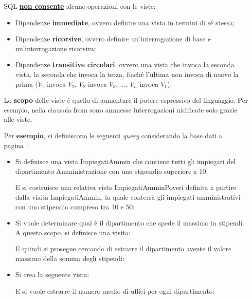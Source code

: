 \documentclass[a4paper]{article}
\begin{document}
	\noindent
	SQL \textbf{\underline{non consente}} alcune operazioni con le viste:
	\begin{itemize}
		\item Dipendenze \textbf{immediate}, ovvero definire una vista in termini di sé stessa;
		
		\item Dipendenze \textbf{ricorsive}, ovvero definire un'interrogazione di base e un'interrogazione ricorsiva;
		
		\item Dipendenze \textbf{transitive circolari}, ovvero una vista che invoca la seconda vista, la seconda che invoca la terza, finché l'ultima non invoca di nuovo la prima ($V_{1}$ invoca $V_{2}$, $V_{2}$ invoca $V_{3}$, ..., $V_{n}$ invoca $V_{1}$).
	\end{itemize}
	Lo \textbf{scopo} delle viste è quello di aumentare il potere espressivo del linguaggio. Per esempio, nella clausola \textsf{from} sono ammesse interrogazioni nidificate solo grazie alle viste.\newline
	
	\noindent
	Per \textcolor{Green4}{\textbf{esempio}}, si definiscono le seguenti \emph{query} considerando la base dati a pagina~\pageref{img: select dbms}:
	\begin{itemize}
		\item Si definisce una vista \textsf{ImpiegatiAmmin} che contiene tutti gli impiegati del dipartimento Amministrazione con uno stipendio superiore a 10:
		
		E si costruisce una relativa vista \textsf{ImpiegatiAmminPoveri} definita a partire dalla visita \textsf{ImpiegatiAmmin}, la quale conterrà gli impiegati amministrativi con uno stipendio compreso tra 10 e 50:
		\newpage
		
		\item Si vuole determinare qual è il dipartimento che spede il massimo in stipendi. A questo scopo, si definisce una visita:
		
		E quindi si prosegue cercando di estrarre il dipartimento avente il valore massimo della somma degli stipendi:
		
		
		\item Si crea la seguente vista:
		
		E si vuole estrarre il numero medio di uffici per ogni dipartimento:
		
	\end{itemize}\newpage
	
\end{document}
